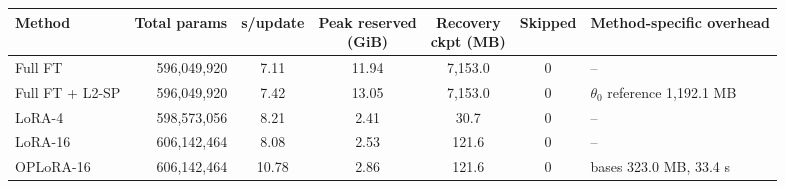 \begin{tabular}{lrccccl}
\toprule
Method & Total params & s/update & \shortstack{Peak reserved\\(GiB)} & \shortstack{Recovery\\ckpt (MB)} & Skipped & Method-specific overhead \\
\midrule
Full FT & 596,049,920 & 7.11 & 11.94 & 7,153.0 & 0 & -- \\
Full FT + L2-SP & 596,049,920 & 7.42 & 13.05 & 7,153.0 & 0 & $\theta_0$ reference 1,192.1 MB \\
LoRA-4 & 598,573,056 & 8.21 & 2.41 & 30.7 & 0 & -- \\
LoRA-16 & 606,142,464 & 8.08 & 2.53 & 121.6 & 0 & -- \\
OPLoRA-16 & 606,142,464 & 10.78 & 2.86 & 121.6 & 0 & bases 323.0 MB, 33.4 s \\
\bottomrule
\end{tabular}